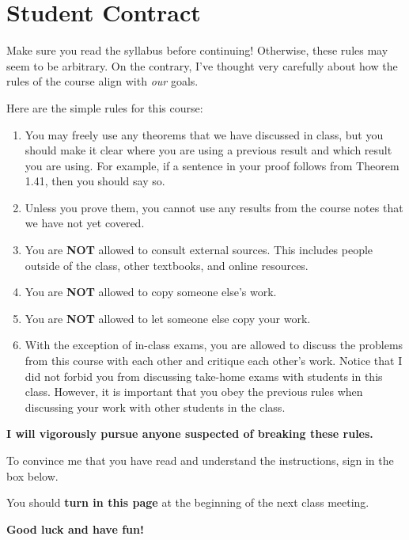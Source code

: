 \documentclass[11pt]{article}
\begin{document}
\section*{Student Contract}

Make sure you read the syllabus before continuing!  Otherwise, these rules may seem to be arbitrary.  On the contrary, I've thought very carefully about how the rules of the course align with \emph{our} goals.

\bigskip

\noindent Here are the simple rules for this course:

\begin{enumerate}
\item You may freely use any theorems that we have discussed in class, but you should make it clear where you are using a previous result and which result you are using.  For example, if a sentence in your proof follows from Theorem 1.41, then you should say so.
\item Unless you prove them, you cannot use any results from the course notes that we have not yet covered.
\item You are \textbf{NOT} allowed to consult external sources.  This includes people outside of the class, other textbooks, and online resources.
\item You are \textbf{NOT} allowed to copy someone else's work.
\item You are \textbf{NOT} allowed to let someone else copy your work.
\item With the exception of in-class exams, you are allowed to discuss the problems from this course with each other and critique each other's work.  Notice that I did not forbid you from discussing take-home exams with students in this class.  However, it is important that you obey the previous rules when discussing your work with other students in the class.
\end{enumerate}

\begin{center}
\textbf{I will vigorously pursue anyone suspected of breaking these rules.}
\end{center}

\bigskip

\noindent To convince me that you have read and understand the instructions, sign in the box below.

\bigskip


\bigskip

\noindent You should \textbf{turn in this page} at the beginning of the next class meeting.

\bigskip

\centerline{\textbf{Good luck and have fun!}}
\end{document}
